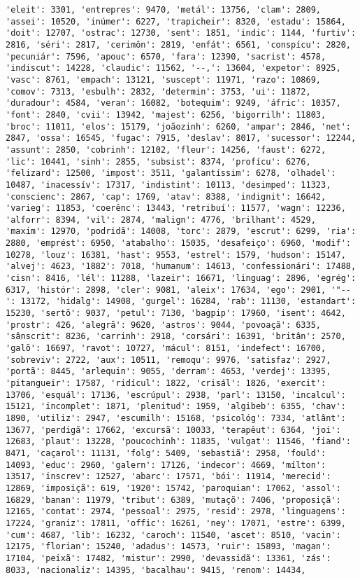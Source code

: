 \begin{Verbatim}[commandchars=\\\{\}]
'eleit': 3301, 'entrepres': 9470, 'metál': 13756, 'clam': 2809, 'assei': 10520, 'inúmer': 6227, 'trapicheir': 8320, 'estadu': 15864, 'doit': 12707, 'ostrac': 12730, 'sent': 1851, 'indic': 1144, 'furtiv': 2816, 'séri': 2817, 'cerimôn': 2819, 'enfát': 6561, 'conspícu': 2820, 'pecuniár': 7596, 'apouc': 6570, 'fara': 12390, 'sacrist': 4578, 'indiscut': 14228, 'claudic': 11562, '--,': 13604, 'expetor': 8925, 'vasc': 8761, 'empach': 13121, 'suscept': 11971, 'razo': 10869, 'comov': 7313, 'esbulh': 2832, 'determin': 3753, 'ui': 11872, 'duradour': 4584, 'veran': 16082, 'botequim': 9249, 'áfric': 10357, 'font': 2840, 'cvii': 13942, 'majest': 6256, 'bigorrilh': 11803, 'broc': 11011, 'elos': 15179, 'joãozinh': 6260, 'ampar': 2846, 'net': 2847, 'ossa': 16545, 'fugac': 7915, 'deslav': 8017, 'sucessor': 12244, 'assunt': 2850, 'cobrinh': 12102, 'fleur': 14256, 'faust': 6272, 'lic': 10441, 'sinh': 2855, 'subsist': 8374, 'profícu': 6276, 'felizard': 12500, 'impost': 3511, 'galantíssim': 6278, 'olhadel': 10487, 'inacessív': 17317, 'indistint': 10113, 'desimped': 11323, 'conscienc': 2867, 'cap': 1769, 'atav': 8388, 'indignit': 16642, 'varieg': 11853, 'coerênc': 13443, 'retribuí': 11577, 'wagn': 12236, 'alforr': 8394, 'vil': 2874, 'malign': 4776, 'brilhant': 4529, 'maxim': 12970, 'podridã': 14008, 'torc': 2879, 'escrut': 6299, 'ria': 2880, 'emprést': 6950, 'atabalho': 15035, 'desafeiço': 6960, 'modif': 10278, 'louz': 16381, 'hast': 9553, 'estrel': 1579, 'hudson': 15147, 'alvej': 4623, '1882': 7018, 'humanum': 14613, 'confessionári': 17488, 'cisn': 8416, 'lél': 11288, 'lazeir': 16671, 'linguag': 2896, 'egrég': 6317, 'histór': 2898, 'cler': 9081, 'aleix': 17634, 'ego': 2901, '"--': 13172, 'hidalg': 14908, 'gurgel': 16284, 'rab': 11130, 'estandart': 15230, 'sertõ': 9037, 'petul': 7130, 'bagpip': 17960, 'isent': 4642, 'prostr': 426, 'alegrã': 9620, 'astros': 9044, 'povoaçã': 6335, 'sânscrit': 8236, 'carrinh': 2918, 'corsári': 16391, 'britân': 2570, 'galõ': 16697, 'ravot': 10727, 'mácul': 8151, 'indefect': 16700, 'sobreviv': 2722, 'aux': 10511, 'remoqu': 9976, 'satisfaz': 2927, 'portã': 8445, 'arlequin': 9055, 'derram': 4653, 'verdej': 13395, 'pitangueir': 17587, 'ridícul': 1822, 'crisál': 1826, 'exercit': 13706, 'esquál': 17136, 'escrúpul': 2938, 'parl': 13150, 'incalcul': 15121, 'incomplet': 1871, 'plenitud': 1959, 'algibeb': 6355, 'chav': 1890, 'utiliz': 2947, 'escumilh': 15168, 'psicológ': 7334, 'atlânt': 13677, 'perdigã': 17662, 'excursã': 10033, 'terapêut': 6364, 'joi': 12683, 'plaut': 13228, 'poucochinh': 11835, 'vulgat': 11546, 'fiand': 8471, 'caçarol': 11131, 'folg': 5409, 'sebastiã': 2958, 'fould': 14093, 'educ': 2960, 'galern': 17126, 'indecor': 4669, 'mílton': 13517, 'inscrev': 12527, 'abarc': 17571, 'bói': 11914, 'merecid': 12869, 'imposiçã': 619, '1920': 15742, 'paroquian': 17062, 'assol': 16829, 'banan': 11979, 'tribut': 6389, 'mutaçõ': 7406, 'proposiçã': 12165, 'contat': 2974, 'pessoal': 2975, 'resid': 2978, 'linguagens': 17224, 'graniz': 17811, 'offic': 16261, 'ney': 17071, 'estre': 6399, 'cum': 4687, 'lib': 16232, 'caroch': 11540, 'ascet': 8510, 'vacin': 12175, 'florian': 15240, 'adadus': 14573, 'ruir': 15893, 'magan': 17104, 'peixã': 17482, 'mistur': 2990, 'devassidã': 13361, 'zás': 8033, 'nacionaliz': 14395, 'bacalhau': 9415, 'renom': 14434, 
\end{Verbatim}
